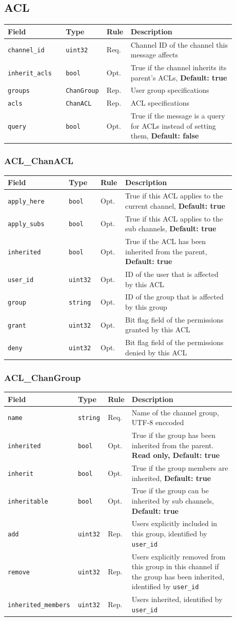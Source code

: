 \documentclass[11pt]{article} %
\newenvironment{mumbleMessageEx}
{%
	\small
	\renewcommand\arraystretch{1.5}
	\begin{tabular}{p{0.25\linewidth}p{0.13\linewidth}p{0.05\linewidth}p{0.45\linewidth}}
	Field & Type & Rule & Description \\
	\hline
}
{%
	\end{tabular}
	\renewcommand\arraystretch{1.0}
}
\newcommand{\mumbleMessageExItem}[4]{ \texttt{#1} & \texttt{#2} & #3 & #4 \\ }
\begin{document}
\subsection{ACL}
\label{msg:acl}

\begin{mumbleMessageEx}
\mumbleMessageExItem{channel\_id}{uint32}{Req.}{Channel ID of the channel this message affects}
\mumbleMessageExItem{inherit\_acls}{bool}{Opt.}{True if the channel inherits its parent's ACLs, \textbf{Default: true}}
\mumbleMessageExItem{groups}{ChanGroup}{Rep.}{User group specifications}
\mumbleMessageExItem{acls}{ChanACL}{Rep.}{ACL specifications}
\mumbleMessageExItem{query}{bool}{Opt.}{True if the message is a query for ACLs instead of setting them, \textbf{Default: false}}
\end{mumbleMessageEx}

\subsubsection{ACL\_ChanACL}
\label{msg:chanACL}

\begin{mumbleMessageEx}
\mumbleMessageExItem{apply\_here}{bool}{Opt.}{True if this ACL applies to the current channel, \textbf{Default: true}}
\mumbleMessageExItem{apply\_subs}{bool}{Opt.}{True if this ACL applies to the sub channels, \textbf{Default: true}}
\mumbleMessageExItem{inherited}{bool}{Opt.}{True if the ACL has been inherited from the parent, \textbf{Default: true}}
\mumbleMessageExItem{user\_id}{uint32}{Opt.}{ID of the user that is affected by this ACL}
\mumbleMessageExItem{group}{string}{Opt.}{ID of the group that is affected by this group}
\mumbleMessageExItem{grant}{uint32}{Opt.}{Bit flag field of the permissions granted by this ACL}
\mumbleMessageExItem{deny}{uint32}{Opt.}{Bit flag field of the permissions denied by this ACL}
\end{mumbleMessageEx}

\subsubsection{ACL\_ChanGroup}
\label{msg:chanGroup}

\begin{mumbleMessageEx}
\mumbleMessageExItem{name}{string}{Req.}{Name of the channel group, UTF-8 enccoded}
\mumbleMessageExItem{inherited}{bool}{Opt.}{True if the group has been inherited from the parent. \textbf{Read only, Default: true}}
\mumbleMessageExItem{inherit}{bool}{Opt.}{True if the group members are inherited, \textbf{Default: true}}
\mumbleMessageExItem{inheritable}{bool}{Opt.}{True if the group can be inherited by sub channels, \textbf{Default: true}}
\mumbleMessageExItem{add}{uint32}{Rep.}{Users explicitly included in this group, identified by \texttt{user\_id}}
\mumbleMessageExItem{remove}{uint32}{Rep.}{Users explicitly removed from this group in this channel if the group has been inherited, identified by \texttt{user\_id}}
\mumbleMessageExItem{inherited\_members}{uint32}{Rep.}{Users inherited, identified by \texttt{user\_id}}
\end{mumbleMessageEx}
\end{document}

